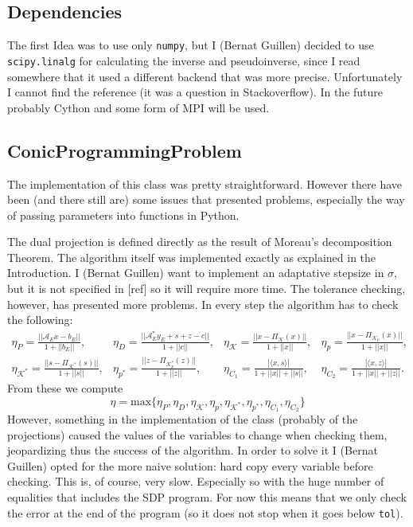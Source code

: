 \documentclass[paper=a4, fontsize=11pt]{scrartcl}
\numberwithin{equation}{section}		%
\numberwithin{figure}{section}			%
\numberwithin{table}{section}				%
\begin{document}
\subsection{Dependencies}
The first Idea was to use only \texttt{numpy}, but I (Bernat Guillen) decided to use \texttt{scipy.linalg} for calculating the inverse and pseudoinverse, since I read somewhere that it used a different backend that was more precise. Unfortunately I cannot find the reference (it was a question in Stackoverflow). In the future probably Cython and some form of MPI will be used.
\subsection{ConicProgrammingProblem}
The implementation of this class was pretty straightforward. However there have been (and there still are) some issues that presented problems, especially the way of passing parameters into functions in Python. 

The dual projection is defined directly as the result of Moreau's decomposition Theorem.
The algorithm itself was implemented exactly as explained in the Introduction. I (Bernat Guillen) want to implement an adaptative stepsize in $\sigma$, but it is not specified in [ref] so it will require more time. The tolerance checking, however, has presented more problems. In every step the algorithm has to check the following:
\begin{align*}
\eta_P = \frac{||\mathcal{A}_Ex-b_E||}{1+||b_E||},&\eta_D=\frac{||\mathcal{A}_E^*y_E+s+z-c||}{1+||c||},&\eta_\mathcal{K}=\frac{||x-\Pi_{\mathcal{K}}(x)||}{1+||x||},&\eta_p = \frac{||x-\Pi_{\mathcal{K}_p}(x)||}{1+||x||},&\\
\eta_{\mathcal{K}^*} = \frac{||s-\Pi_{\mathcal{K^*}}(s)||}{1+||s||},&\eta_{p^*} = \frac{||z - \Pi_{\mathcal{K}_p^*}(z)||}{1+||z||},&\eta_{C_1} = \frac{|\langle x,s \rangle|}{1+||x|| +||s||},&\eta_{C_2} = \frac{|\langle x,z \rangle |}{1+||x|| +||z||}.&
\end{align*}
From these we compute $$\eta = \text{max}\{\eta_P,\eta_D,\eta_{\mathcal{K}},\eta_p,\eta_{\mathcal{K}^*}, \eta_{p^*}, \eta_{C_1},\eta_{C_2}\}$$
However, something in the implementation of the class (probably of the projections) caused the values of the variables to change when checking them, jeopardizing thus the success of the algorithm. In order to solve it I (Bernat Guillen) opted for the more naive solution: hard copy every variable before checking. This is, of course, very slow. Especially so with the huge number of equalities that includes the SDP program. For now this means that we only check the error at the end of the program (so it does not stop when it goes below \texttt{tol}). 
\end{document}
